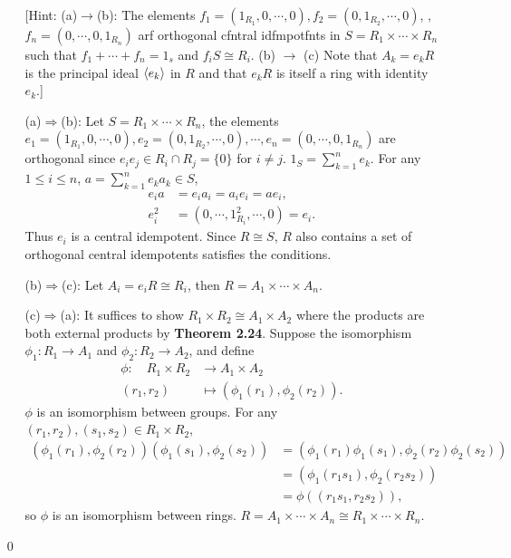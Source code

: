 \begin{enumerate}
\begin{enumerate}
	[Hint: (a)$\to$(b): The elements $f_1 = (1_{R_1},0, \cdots ,0), f_2 = (0,1_{R_2}, \cdots ,0)$, ,$ f_n = (0, \cdots ,0,1_{R_n})$ 
	arf orthogonal cfntral idfmpotfnts in $S = R_1 \times \cdots \times R_n$ such that $f_1 + \cdots + f_n = 1_s$ and $f_iS\cong R_i$. 
	(b) $\to$ (c) Note that $A_k = e_k R$ is the principal ideal $\langle e_k\rangle$ in $R$ and that $e_kR$ is itself a ring with identity $e_k$.]
\end{enumerate}
\soln
\begin{itemize}
	\item[(a)$\Rightarrow$(b):] Let $S=R_1 \times \cdots \times R_n$, the elements $e_1 = (1_{R_1},0, \cdots ,0), e_2 = (0,1_{R_2}, \cdots ,0), \cdots , e_n = (0, \cdots ,0,1_{R_n})$ are orthogonal since $e_i e_j \in R_i \cap R_j =\{0\}$ for $i\neq j$. $1_S=\sum_{k=1}^n e_k$. For any $1\leq i\leq n$, $a=\sum_{k=1}^n e_k a_k\in S$, 
	\begin{align*}
		e_i a &= e_i a_i = a_i e_i = a e_i,\\
		e_i^2 &= (0,\cdots,1_{R_i}^2,\cdots,0)= e_i.
	\end{align*}
	Thus $e_i$ is a central idempotent. Since $R\cong S$, $R$ also contains a set of orthogonal central idempotents satisfies the conditions.
	\item[(b)$\Rightarrow$(c):] Let $A_i=e_i R\cong R_i$, then $R= A_1 \times \cdots \times A_n$.
	\item[(c)$\Rightarrow$(a):] It suffices to show $R_1\times R_2\cong A_1 \times A_2$ where the products are both external products by \textbf{Theorem 2.24}. Suppose the isomorphism $\phi_1: R_1 \to A_1$ and $\phi_2: R_2 \to A_2$, and define
	\begin{align*}
		\phi:\quad R_1\times R_2 &\to A_1 \times A_2 \\
		(r_1,r_2) &\mapsto (\phi_1(r_1),\phi_2(r_2)).
	\end{align*}
	$\phi$ is an isomorphism between groups. For any $(r_1,r_2),(s_1,s_2)\in R_1\times R_2$, \begin{align*}
		(\phi_1(r_1),\phi_2(r_2))(\phi_1(s_1),\phi_2(s_2))&=(\phi_1(r_1)\phi_1(s_1),\phi_2(r_2)\phi_2(s_2)) \\
		&= (\phi_1(r_1s_1),\phi_2(r_2s_2)) \\
		&= \phi((r_1s_1,r_2s_2)),
	\end{align*}
	so $\phi$ is an isomorphism between rings. $R= A_1 \times \cdots \times A_n\cong  R_1 \times \cdots \times R_n$.
\end{itemize}

\qed

\end{enumerate}
